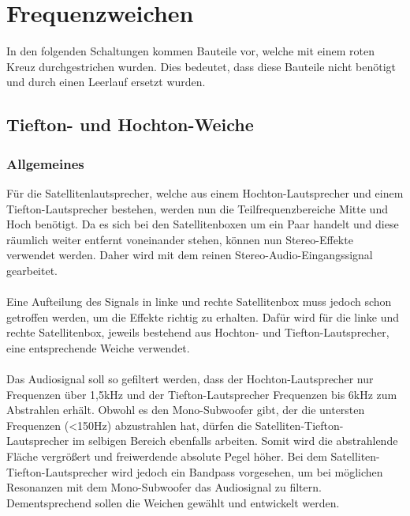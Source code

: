 


\newpage
\section{Frequenzweichen}
In den folgenden Schaltungen kommen Bauteile vor, welche mit einem roten Kreuz durchgestrichen wurden.
Dies bedeutet, dass diese Bauteile nicht benötigt und durch einen Leerlauf ersetzt wurden.
\subsection*{Tiefton- und Hochton-Weiche}\label{sec:5.4}
\subsubsection{Allgemeines}\label{subsec:5.4.1}
Für die Satellitenlautsprecher, welche aus einem Hochton-Lautsprecher und einem Tiefton-Lautsprecher bestehen, werden nun die Teilfrequenzbereiche Mitte und Hoch benötigt.
Da es sich bei den Satellitenboxen um ein Paar handelt und diese räumlich weiter entfernt voneinander stehen, können nun Stereo-Effekte verwendet werden.
Daher wird mit dem reinen Stereo-Audio-Eingangssignal gearbeitet.
\\ \\
Eine Aufteilung des Signals in linke und rechte Satellitenbox muss jedoch schon getroffen werden, um die Effekte richtig zu erhalten.
Dafür wird für die linke und rechte Satellitenbox, jeweils bestehend aus Hochton- und Tiefton-Lautsprecher, eine entsprechende Weiche verwendet.
\\ \\
Das Audiosignal soll so gefiltert werden, dass der Hochton-Lautsprecher nur Frequenzen über 1,5kHz und der Tiefton-Lautsprecher Frequenzen bis 6kHz zum Abstrahlen erhält.
Obwohl es den Mono-Subwoofer gibt, der die untersten Frequenzen (<150Hz) abzustrahlen hat, dürfen die Satelliten-Tiefton-Lautsprecher im selbigen Bereich ebenfalls arbeiten.
Somit wird die abstrahlende Fläche vergrößert und freiwerdende absolute Pegel höher.
Bei dem Satelliten-Tiefton-Lautsprecher wird jedoch ein Bandpass vorgesehen, um bei möglichen Resonanzen mit dem Mono-Subwoofer das Audiosignal zu filtern.
\\
Dementsprechend sollen die Weichen gewählt und entwickelt werden.
\\

